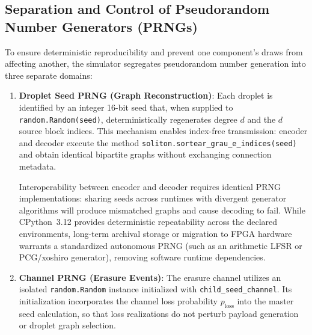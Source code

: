 \subsection{Separation and Control of Pseudorandom Number Generators (PRNGs)}

To ensure deterministic reproducibility and prevent one component's draws from affecting another, the simulator segregates pseudorandom number generation into three separate domains:

\begin{enumerate}
    \item \textbf{Droplet Seed PRNG (Graph Reconstruction)}: Each droplet is identified by an integer 16-bit seed that, when supplied to \texttt{random.Random(seed)}, deterministically regenerates degree $d$ and the $d$ source block indices. This mechanism enables index-free transmission: encoder and decoder execute the method \texttt{soliton.sortear\_grau\_e\_indices(seed)} and obtain identical bipartite graphs without exchanging connection metadata.
    
    Interoperability between encoder and decoder requires identical PRNG implementations: sharing seeds across runtimes with divergent generator algorithms will produce mismatched graphs and cause decoding to fail. While CPython~3.12 provides deterministic repeatability across the declared environments, long-term archival storage or migration to FPGA hardware warrants a standardized autonomous PRNG (such as an arithmetic LFSR or PCG/xoshiro generator), removing software runtime dependencies.

    \item \textbf{Channel PRNG (Erasure Events)}: The erasure channel utilizes an isolated \texttt{random.Random} instance initialized with \texttt{child\_seed\_channel}. Its initialization incorporates the channel loss probability $p_{\text{loss}}$ into the master seed calculation, so that loss realizations do not perturb payload generation or droplet graph selection.


\end{enumerate}
